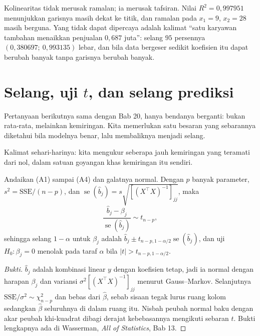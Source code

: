 Kolinearitas tidak merusak ramalan; ia merusak tafsiran. Nilai $R^2=0{,}997951$
menunjukkan garisnya masih dekat ke titik, dan ramalan pada $x_1=9$, $x_2=28$ masih
berguna. Yang tidak dapat dipercaya adalah kalimat ``satu karyawan tambahan menaikkan
penjualan $0{,}687$ juta'': selang $95$ persennya $(0{,}380697;\ 0{,}993135)$ lebar,
dan bila data bergeser sedikit koefisien itu dapat berubah banyak tanpa garisnya
berubah banyak.

\section{Selang, uji $t$, dan selang prediksi}

Pertanyaan berikutnya sama dengan Bab 20, hanya bendanya berganti: bukan rata-rata,
melainkan kemiringan. Kita memerlukan satu besaran yang sebarannya diketahui bila
modelnya benar, lalu membaliknya menjadi selang.

Kalimat sehari-harinya: kita mengukur seberapa jauh kemiringan yang teramati dari nol,
dalam satuan goyangan khas kemiringan itu sendiri.


\begin{teorema}
Andaikan (A1) sampai (A4) dan galatnya normal. Dengan $p$ banyak parameter,
$s^2=\mathrm{SSE}/(n-p)$, dan $\operatorname{se}(\hat b_j)=s\sqrt{[(X^{\top}X)^{-1}]_{jj}}$,
maka
\[
\frac{\hat b_j-\beta_j}{\operatorname{se}(\hat b_j)}\sim t_{n-p},
\]
sehingga selang $1-\alpha$ untuk $\beta_j$ adalah
$\hat b_j\pm t_{n-p,1-\alpha/2}\operatorname{se}(\hat b_j)$, dan uji $H_0\colon\beta_j=0$
menolak pada taraf $\alpha$ bila $|t|>t_{n-p,1-\alpha/2}$.
\end{teorema}

\begin{proof}[Bukti]
$\hat b_j$ adalah kombinasi linear $y$ dengan koefisien tetap, jadi ia normal dengan
harapan $\beta_j$ dan variansi $\sigma^2[(X^{\top}X)^{-1}]_{jj}$ menurut Gauss--Markov.
Selanjutnya $\mathrm{SSE}/\sigma^2\sim\chi^2_{n-p}$ dan bebas dari $\hat\beta$, sebab
sisaan tegak lurus ruang kolom sedangkan $\hat\beta$ seluruhnya di dalam ruang itu.
Nisbah peubah normal baku dengan akar peubah khi-kuadrat dibagi derajat kebebasannya
mengikuti sebaran $t$. Bukti lengkapnya ada di Wasserman, \emph{All of Statistics},
Bab 13.
\end{proof}

